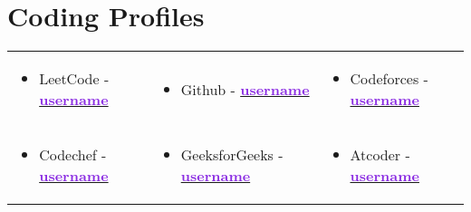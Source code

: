 \documentclass[letterpaper,11pt]{article}
\begin{document}

\section{Coding Profiles}
\renewcommand{\arraystretch}{0}
\begin{tabular}{p{}p{}p{}}
  \begin{itemize}[leftmargin=*, topsep=0pt]
    \item LeetCode - \href{https://leetcode.com/username}{\textbf{\textcolor{BlueViolet}{username}}}
  \end{itemize} &
  \begin{itemize}[leftmargin=*, topsep=0pt]
    \item Github - \href{https://github.com/username}{\textbf{\textcolor{BlueViolet}{username}}}
  \end{itemize} &
  \begin{itemize}[leftmargin=*, topsep=0pt]
    \item Codeforces - \href{https://codeforces.com/profile/username}{\textbf{\textcolor{BlueViolet}{username}}}
  \end{itemize} \\
  \begin{itemize}[leftmargin=*, topsep=0pt]
    \item Codechef - \href{https://www.codechef.com/users/username}{\textbf{\textcolor{BlueViolet}{username}}}
  \end{itemize} &
  \begin{itemize}[leftmargin=*, topsep=0pt]
    \item GeeksforGeeks - \href{https://auth.geeksforgeeks.org/user/username/practice/}{\textbf{\textcolor{BlueViolet}{username}}}
  \end{itemize} &
  \begin{itemize}[leftmargin=*, topsep=0pt]
    \item Atcoder - \href{https://atcoder.jp/users/username}{\textbf{\textcolor{BlueViolet}{username}}}
  \end{itemize} \\
\end{tabular}


\end{document}
